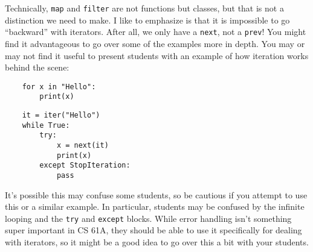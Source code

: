 \begin{meta}
Technically, \lstinline{map} and \lstinline{filter} are not functions but classes, but that is not a distinction we need to make. 
I like to emphasize is that it is impossible to go ``backward'' with iterators. After all, we only have a \lstinline{next}, not a \lstinline{prev}!    
You might find it advantageous to go over some of the examples more in depth. 
You may or may not find it useful to present students with an example of how iteration works behind the scene: 

\begin{center}
    \begin{minipage}[t]{0.4\textwidth}
    \begin{lstlisting}
    for x in "Hello":
        print(x)
    \end{lstlisting}
    \end{minipage}
    \begin{minipage}[t]{0.4\textwidth}
    \begin{lstlisting}
    it = iter("Hello")
    while True:
        try: 
            x = next(it)
            print(x)
        except StopIteration:
            pass
    \end{lstlisting}
    \end{minipage}
\end{center}

It's possible this may confuse some students, so be cautious if you attempt to use this or a similar example. In particular, students may be confused by the infinite looping and the \lstinline{try} and \lstinline{except} blocks. While error handling isn't something super important in CS 61A, they should be able to use it specifically for dealing with iterators, so it might be a good idea to go over this a bit with your students. 
\end{meta}